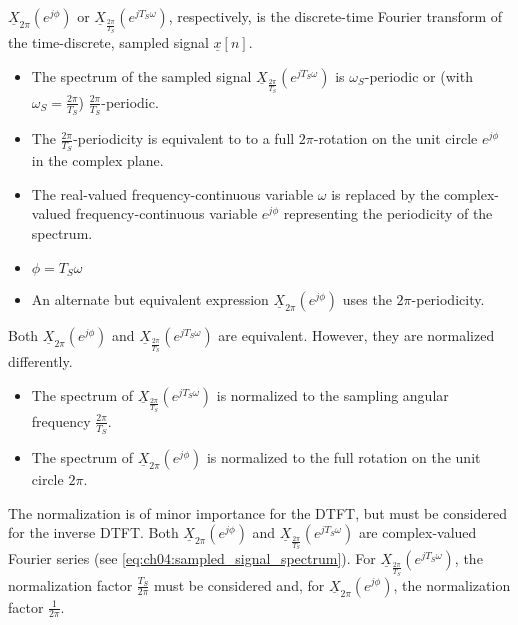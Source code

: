 \begin{refsection}
$\underline{X}_{2 \pi} \left(e^{j \phi}\right)$ or $\underline{X}_{\frac{2\pi}{T_S}} \left(e^{j T_S \omega}\right)$, respectively, is the discrete-time Fourier transform of the time-discrete, sampled signal $\underline{x}[n]$.
\begin{itemize}
	\item The spectrum of the sampled signal $\underline{X}_{\frac{2\pi}{T_S}} \left(e^{j T_S \omega}\right)$ is $\omega_S$-periodic or (with $\omega_S = \frac{2\pi}{T_S}$) $\frac{2\pi}{T_S}$-periodic.
	\item The $\frac{2\pi}{T_S}$-periodicity is equivalent to to a full $2\pi$-rotation on the unit circle $e^{j \phi}$ in the complex plane.
	\item The real-valued frequency-continuous variable $\omega$ is replaced by the complex-valued frequency-continuous variable $e^{j \phi}$ representing the periodicity of the spectrum.
	\item $\phi = T_S \omega$
	\item An alternate but equivalent expression $\underline{X}_{2 \pi} \left(e^{j \phi}\right)$ uses the $2\pi$-periodicity.
\end{itemize}

Both $\underline{X}_{2 \pi} \left(e^{j \phi}\right)$ and $\underline{X}_{\frac{2\pi}{T_S}} \left(e^{j T_S \omega}\right)$ are equivalent. However, they are normalized differently.
\begin{itemize}
	\item The spectrum of $\underline{X}_{\frac{2\pi}{T_S}} \left(e^{j T_S \omega}\right)$ is normalized to the sampling angular frequency $\frac{2 \pi}{T_S}$.
	\item The spectrum of $\underline{X}_{2 \pi} \left(e^{j \phi}\right)$ is normalized to the full rotation on the unit circle $2 \pi$.
\end{itemize}
The normalization is of minor importance for the \ac{DTFT}, but must be considered for the inverse \ac{DTFT}. Both $\underline{X}_{2 \pi} \left(e^{j \phi}\right)$ and $\underline{X}_{\frac{2\pi}{T_S}} \left(e^{j T_S \omega}\right)$ are complex-valued Fourier series (see \eqref{eq:ch04:sampled_signal_spectrum}). For $\underline{X}_{\frac{2\pi}{T_S}} \left(e^{j T_S \omega}\right)$, the normalization factor $\frac{T_S}{2 \pi}$ must be considered and, for $\underline{X}_{2 \pi} \left(e^{j \phi}\right)$, the normalization factor $\frac{1}{2 \pi}$.


\end{refsection}
